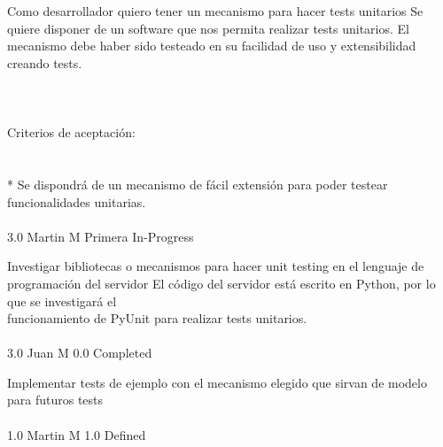 \vspace{20pt}

	{Como desarrollador quiero tener un mecanismo para hacer tests unitarios} %
	{Se quiere disponer de un software que nos permita realizar tests unitarios. El\\
mecanismo debe haber sido testeado en su facilidad de uso y extensibilidad\\
creando tests.\\
\\
  \\
  \\
Criterios de aceptación:\\
\\
  \\
* Se dispondrá de un mecanismo de fácil extensión para poder testear funcionalidades unitarias. \\
\\
} %
	{} %
	{3.0} %
	{Martin M} %
	{Primera} %
	{In-Progress} %

		{Investigar bibliotecas o mecanismos para hacer unit testing en el lenguaje de programación del servidor} %
		{El código del servidor está escrito en Python, por lo que se investigará el\\
funcionamiento de PyUnit para realizar tests unitarios.\\
\\
} %
		{3.0} %
		{Juan M} %
		{0.0} %
		{Completed} %

		{Implementar tests de ejemplo con el mecanismo elegido que sirvan de modelo para futuros tests} %
		{\\
\\
} %
		{1.0} %
		{Martin M} %
		{1.0} %
		{Defined} %


\vspace{20pt}

